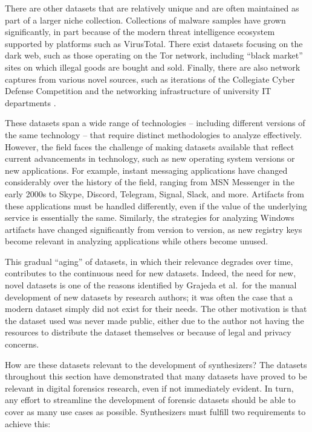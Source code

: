\documentclass[letterpaper,12pt]{report}
\begin{document}
There are other datasets that are relatively unique and are often
maintained as part of a larger niche collection. Collections of malware
samples have grown significantly, in part because of the modern threat
intelligence ecosystem supported by platforms such as VirusTotal. There
exist datasets focusing on the dark web, such as those operating on the
Tor network, including ``black market'' sites on which illegal goods are
bought and sold. Finally, there are also network captures from various
novel sources, such as iterations of the Collegiate Cyber Defense
Competition and the networking infrastructure of university IT
departments \cite{grajedaAvailabilityDatasetsDigital2017}.

These datasets span a wide range of technologies -- including different
versions of the same technology -- that require distinct methodologies
to analyze effectively. However, the field faces the challenge of making
datasets available that reflect current advancements in technology, such
as new operating system versions or new applications. For example,
instant messaging applications have changed considerably over the
history of the field, ranging from MSN Messenger in the early 2000s to
Skype, Discord, Telegram, Signal, Slack, and more. Artifacts from these
applications must be handled differently, even if the value of the
underlying service is essentially the same. Similarly, the strategies
for analyzing Windows artifacts have changed significantly from version
to version, as new registry keys become relevant in analyzing
applications while others become unused.

This gradual ``aging'' of datasets, in which their relevance degrades
over time, contributes to the continuous need for new datasets. Indeed,
the need for new, novel datasets is one of the reasons identified by
Grajeda et al.~for the manual development of new datasets by research
authors; it was often the case that a modern dataset simply did not
exist for their needs. The other motivation is that the dataset used was
never made public, either due to the author not having the resources to
distribute the dataset themselves or because of legal and privacy
concerns.

How are these datasets relevant to the development of synthesizers? The
datasets throughout this section have demonstrated that many datasets
have proved to be relevant in digital forensics research, even if not
immediately evident. In turn, any effort to streamline the development
of forensic datasets should be able to cover as many use cases as
possible. Synthesizers must fulfill two requirements to achieve this:
\end{document}
